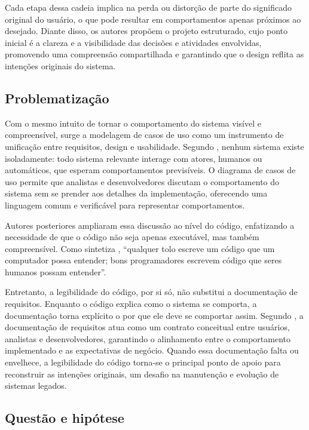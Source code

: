 \documentclass[12pt,a4paper]{article}
\begin{document}
Cada etapa dessa cadeia implica na perda ou distorção de parte do significado original do usuário, o que pode resultar em comportamentos apenas próximos ao desejado. Diante disso, os autores propõem o projeto estruturado, cujo ponto inicial é a clareza e a visibilidade das decisões e atividades envolvidas, promovendo uma compreensão compartilhada e garantindo que o design reflita as intenções originais do sistema.

\subsection{Problematização}

Com o mesmo intuito de tornar o comportamento do sistema visível e compreensível, surge a modelagem de casos de uso como um instrumento de unificação entre requisitos, design e usabilidade. Segundo \textcite{booch1999unified}, nenhum sistema existe isoladamente: todo sistema relevante interage com atores, humanos ou automáticos, que esperam comportamentos previsíveis. O diagrama de casos de uso permite que analistas e desenvolvedores discutam o comportamento do sistema sem se prender aos detalhes da implementação, oferecendo uma linguagem comum e verificável para representar comportamentos.

Autores posteriores ampliaram essa discussão ao nível do código, enfatizando a necessidade de que o código não seja apenas executável, mas também compreensível. Como sintetiza \textcite{fowler2018refactoring}, “qualquer tolo escreve um código que um computador possa entender; bons programadores escrevem código que seres humanos possam entender”.

Entretanto, a legibilidade do código, por si só, não substitui a documentação de requisitos. Enquanto o código explica como o sistema se comporta, a documentação torna explícito o por que ele deve se comportar assim. Segundo \textcite{sommerville1997requirements}, a documentação de requisitos atua como um contrato conceitual entre usuários, analistas e desenvolvedores, garantindo o alinhamento entre o comportamento implementado e as expectativas de negócio. Quando essa documentação falta ou envelhece, a legibilidade do código torna-se o principal ponto de apoio para reconstruir as intenções originais, um desafio na manutenção e evolução de sistemas legados.

\subsection{Questão e hipótese}
\end{document}
